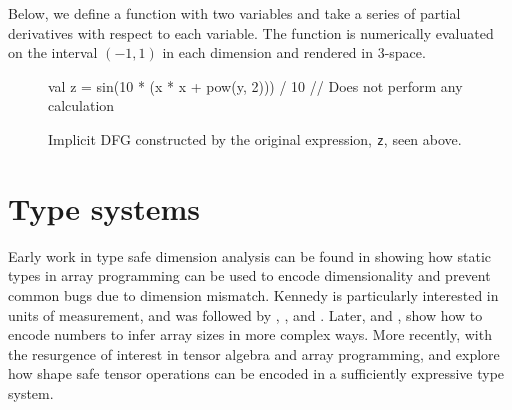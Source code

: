 \documentclass[12pt,initial,twoside,maitrise]{dms}
\numberwithin{equation}{section}
\numberwithin{table}{chapter}
\numberwithin{figure}{chapter}
\begin{document}
%
Below, we define a function with two variables and take a series of partial derivatives with respect to each variable. The function is numerically evaluated on the interval $(-1, 1)$ in each dimension and rendered in 3-space. %
%
\begin{figure}
\begin{mylisting}[language=Kotlin, basicstyle=\ttfamily\footnotesize]
val z = sin(10 * (x * x + pow(y, 2))) / 10 // Does not perform any calculation
\end{mylisting}
\centering
{}
\caption{Implicit DFG constructed by the original expression, \texttt{z}, seen above.}
    \label{lst:edsl}
\end{figure}



\section{Type systems}\label{sec:type-systems}

Early work in type safe dimension analysis can be found in \citet{kennedy1994dimension, kennedy1996programming} showing how static types in array programming can be used to encode dimensionality and prevent common bugs due to dimension mismatch. Kennedy is particularly interested in units of measurement, and was followed by \citet{jay1996shape}, \citet{rittri1995dimension}, and \citet{zenger1997indexed}. Later, \citet{kiselyov2005number, kiselyov2010fun} and \citet{griffioen2015type}, show how to encode numbers to infer array sizes in more complex ways. More recently, with the resurgence of interest in tensor algebra and array programming, \citet{chen2017typesafe} and \citet{rink2018modeling} explore how shape safe tensor operations can be encoded in a sufficiently expressive type system.
\end{document}
